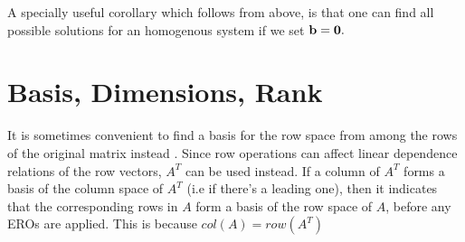 \documentclass[english,course]{Notes}
\begin{document}
	      	
	      	\par{A specially useful corollary which follows from above, is that one can find all possible solutions for an homogenous system if we set $\mathbf{b} = \mathbf{0}.$}
	      	
	      	
	      	\newpage

	      	\section{Basis, Dimensions, Rank}
	      	
	      	
		
		\par{It is sometimes convenient to find a basis for the row space from among the rows of the original matrix instead . Since row operations can affect linear dependence relations of the row vectors, $A^{T}$ can be used instead. If a column of $A^{T}$ forms a basis of the column space of $A^{T}$ (i.e if there's a leading one), then it indicates that the corresponding rows in $A$ form a basis of the row space of $A$, before any EROs are applied. This is because $col(A) = row(A^{T})$  }
	      	
	      	\todos
	      	\nocite{*}
	      	\printbibliography
	      	
\end{document}
